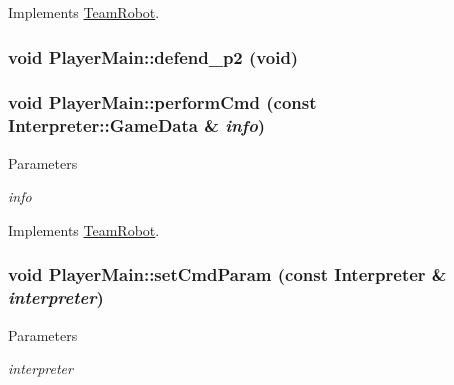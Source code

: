 Implements \hyperlink{classTeamRobot_a71ec65db46db1ac511fe17b668d4f192}{TeamRobot}.

\hypertarget{classPlayerMain_a64e1d5734e07cfa82b2571aa11bb4f9d}{
\subsubsection[{defend\_\-p2}]{\setlength{\rightskip}{0pt plus 5cm}void PlayerMain::defend\_\-p2 (void)}}
\label{classPlayerMain_a64e1d5734e07cfa82b2571aa11bb4f9d}
\hypertarget{classPlayerMain_af12a95c226ce973056681a138b55fb6c}{
\subsubsection[{performCmd}]{\setlength{\rightskip}{0pt plus 5cm}void PlayerMain::performCmd (const {\bf Interpreter::GameData} \& {\em info})}}
\label{classPlayerMain_af12a95c226ce973056681a138b55fb6c}

\begin{DoxyParams}{Parameters}
\item[{\em info}]\end{DoxyParams}


Implements \hyperlink{classTeamRobot_a9b84df51ca16a7203fdb6498ea6741da}{TeamRobot}.

\hypertarget{classPlayerMain_a5c4af159392663660f91809052422945}{
\subsubsection[{setCmdParam}]{\setlength{\rightskip}{0pt plus 5cm}void PlayerMain::setCmdParam (const {\bf Interpreter} \& {\em interpreter})}}
\label{classPlayerMain_a5c4af159392663660f91809052422945}

\begin{DoxyParams}{Parameters}
\item[{\em interpreter}]\end{DoxyParams}


